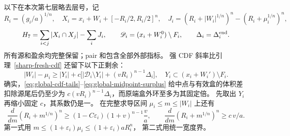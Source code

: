 以下在本次第七层略去层号，记
\[
 R_i=(g_i/a)^{1/n},\quad
 X_i=x_i+W_i+[-R_i/2,R_i/2]^n,\quad
 J_i=(R_i+|W_i|^{1/n})^n-(R_i+\mu_i^{1/n})^n,
\]
\[
 H_7=\sum_{i<j}|X_i\cap X_j|-\sum_iJ_i,\qquad
 \mathscr D_i=(x_i+W_i^0)\setminus F_i,\qquad \Delta_i=\Delta_i^{\rm end}.
\]
所有源和盈余均完整保留；pair 和包含全部外部指标。
强 CDF 斜率比引理~\ref{sharp-fresh-cdf} 还留下以下正剩余：
\begin{equation}\label{seventh:cdf-reserve}
 |W_i|-\mu_i\ge |Y_i|+
 c\bigl[|\mathscr D_i\setminus Y_i|+(vR_i)^{n-1}\Delta_i\bigr],
 \quad Y_i\subset(x_i+W_i')\setminus F_i.
\end{equation}
确实，\eqref{eq:global-cdf-tails}--\eqref{eq:global-midpoint-surplus}
给中点与有效盒的体积差扣除源尾后仍至少为
\(c(vR_i)^{n-1}\Delta_i\)，而原端盒外环至多为其固定倍。
先取出 \(Y_i\) 再缩小固定 \(c\)，其系数仍是一。
在完整求导区间 \(\mu_i\le m\le|W_i|\) 上还有
\begin{equation}\label{seventh:derivative}
 \frac{d}{dm}(R_i+m^{1/n})^n
 \ge(1-C\varepsilon_i)(1+v)^{n-1}\frac va,\qquad
 \frac{d}{dm}(R_i+m^{1/n})^n\ge c\,v/a.
\end{equation}
第一式用 \(m\le(1+\varepsilon_i)\mu_i\le(1+\varepsilon_i)aR_i^n\)，
第二式用统一宽度界。

